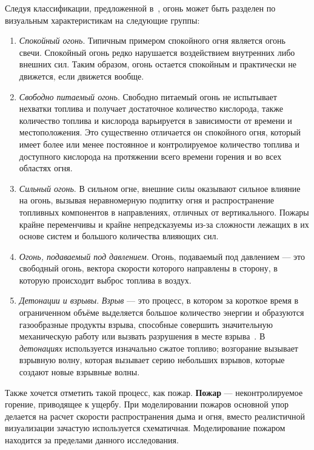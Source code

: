 Следуя классификации, предложенной в~\cite{nielsen}, огонь может быть разделен
по визуальным характеристикам на следующие группы:
\begin{enumerate}
    \item \emph{Спокойный огонь}. Типичным примером спокойного огня
        является \break{} огонь свечи. Спокойный огонь редко нарушается
        воздействием внутренних либо внешних сил. Таким образом, огонь остается
        спокойным и практически не движется, если движется вообще.

    \item \emph{Свободно питаемый огонь}. Свободно питаемый огонь не
        испытывает нехватки топлива и получает достаточное количество кислорода,
        также количество топлива и кислорода варьируется в зависимости от
        времени и местоположения. Это существенно отличается он спокойного огня,
        который имеет более или менее постоянное и контролируемое количество
        топлива и доступного кислорода на протяжении всего времени горения и во
        всех областях огня.

    \item \emph{Сильный огонь}. В сильном огне, внешние силы оказывают сильное
        влияние на огонь, вызывая неравномерную подпитку огня и распространение
        топливных компонентов в направлениях, отличных от вертикального. Пожары
        крайне переменчивы и крайне непредсказуемы из-за сложности лежащих в их
        основе систем и большого количества влияющих сил.

    \item \emph{Огонь, подаваемый под давлением}. Огонь, подаваемый под
        давлением --- это свободный огонь, вектора скорости которого направлены
        в сторону, в которую происходит выброс топлива в воздух.

    \item \emph{Детонации и взрывы}. \emph{Взрыв} — это процесс, в котором за
        короткое время в ограниченном объёме выделяется большое количество
        энергии и образуются газообразные продукты взрыва, способные совершить
        значительную механическую работу или вызвать разрушения в месте
        взрыва~\cite{WikiDetonation}. В \emph{детонациях} используется изначально
        сжатое топливо; возгорание вызывает взрывную волну, которая вызывает
        серию небольших взрывов, которые создают новые взрывные волны.
\end{enumerate}

Также хочется отметить такой процесс, как пожар. \textbf{Пожар} ---
неконтролируемое горение, приводящее к ущербу. При моделировании пожаров
основной упор делается на расчет скорости распространения дыма и огня, вместо
реалистичной визуализации зачастую используется схематичная. Моделирование
пожаром находится за пределами данного исследования.

